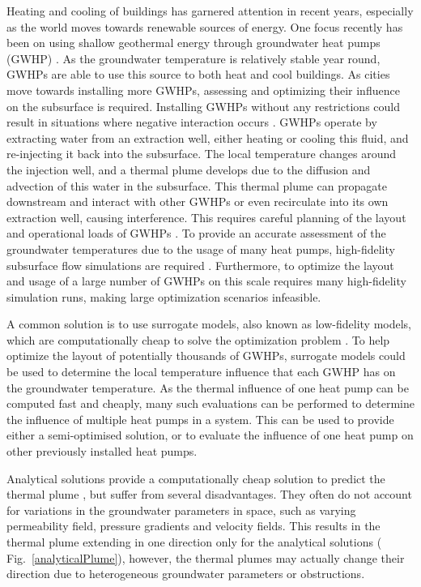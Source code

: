 \documentclass{article} %
\begin{document}
Heating and cooling of buildings has garnered attention in recent years, especially as the world moves towards renewable sources of energy. 
One focus recently has been on using shallow geothermal energy through groundwater heat pumps (GWHP) \citep{Halilovic2022}. 
As the groundwater temperature is relatively stable year round, GWHPs are able to use this source to both heat and cool buildings. %
As cities move towards installing more GWHPs, assessing and optimizing their influence on the subsurface is required. 
Installing GWHPs without any restrictions could result in situations where negative interaction occurs \citep{Garcia2020, Daemi2019}. 
GWHPs operate by extracting water from an extraction well, either heating or cooling this fluid, and re-injecting it back into the subsurface.  
The local temperature changes around the injection well, and a thermal plume develops due to the diffusion and advection of this water in the subsurface. 
This thermal plume can propagate downstream and interact with other GWHPs or even recirculate into its own extraction well, causing interference. 
This requires careful planning of the layout and operational loads of GWHPs \citep{Beck2013}. 
To provide an accurate assessment of the groundwater temperatures due to the usage of many heat pumps, high-fidelity subsurface flow simulations are required \citep{Meng2019}. 
Furthermore, to optimize the layout and usage of a large number of GWHPs on this scale requires many high-fidelity simulation runs, making large optimization scenarios infeasible.

A common solution is to use surrogate models, also known as low-fidelity models, which are computationally cheap to solve the optimization problem \citep{Sbai2019, Nagoor2019, Robinson2012}. 
To help optimize the layout of potentially thousands of GWHPs, surrogate models could be used to determine the local temperature influence that each GWHP has on the groundwater temperature. 
As the thermal influence of one heat pump can be computed fast and cheaply, many such evaluations can be performed to determine the influence of multiple heat pumps in a system. 
This can be used to provide either a semi-optimised solution, or to evaluate the influence of one heat pump on other previously installed heat pumps. 

Analytical solutions provide a computationally cheap solution to predict the thermal plume \citep{Pophillat2020}, but suffer from several disadvantages. 
They often do not account for variations in the groundwater parameters in space, such as varying permeability field, pressure gradients and velocity fields. 
This results in the thermal plume extending in one direction only for the analytical solutions ( Fig.~\ref{analyticalPlume}), however, the thermal plumes may actually change their direction due to heterogeneous groundwater parameters or obstructions. 
\end{document}
